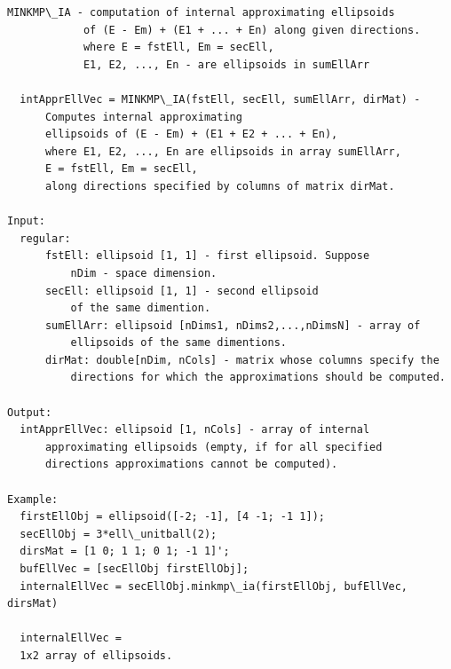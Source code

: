 \documentclass[letterpaper,10pt,english]{sphinxmanual}
\begin{document}
\begin{Verbatim}[commandchars=\\\{\}]
MINKMP\_IA - computation of internal approximating ellipsoids
            of (E - Em) + (E1 + ... + En) along given directions.
            where E = fstEll, Em = secEll,
            E1, E2, ..., En - are ellipsoids in sumEllArr

  intApprEllVec = MINKMP\_IA(fstEll, secEll, sumEllArr, dirMat) -
      Computes internal approximating
      ellipsoids of (E - Em) + (E1 + E2 + ... + En),
      where E1, E2, ..., En are ellipsoids in array sumEllArr,
      E = fstEll, Em = secEll,
      along directions specified by columns of matrix dirMat.

Input:
  regular:
      fstEll: ellipsoid [1, 1] - first ellipsoid. Suppose
          nDim - space dimension.
      secEll: ellipsoid [1, 1] - second ellipsoid
          of the same dimention.
      sumEllArr: ellipsoid [nDims1, nDims2,...,nDimsN] - array of
          ellipsoids of the same dimentions.
      dirMat: double[nDim, nCols] - matrix whose columns specify the
          directions for which the approximations should be computed.

Output:
  intApprEllVec: ellipsoid [1, nCols] - array of internal
      approximating ellipsoids (empty, if for all specified
      directions approximations cannot be computed).

Example:
  firstEllObj = ellipsoid([-2; -1], [4 -1; -1 1]);
  secEllObj = 3*ell\_unitball(2);
  dirsMat = [1 0; 1 1; 0 1; -1 1]';
  bufEllVec = [secEllObj firstEllObj];
  internalEllVec = secEllObj.minkmp\_ia(firstEllObj, bufEllVec, dirsMat)

  internalEllVec =
  1x2 array of ellipsoids.
\end{Verbatim}
\end{document}
